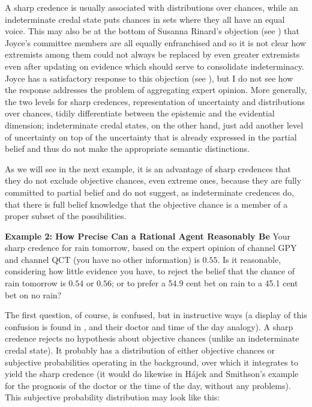 A sharp credence is usually associated with
distributions over chances, while an indeterminate
credal state puts chances in sets where they all have
an equal voice. This may also be at the bottom of
Susanna Rinard's objection (see
) that Joyce's committee members
are all equally enfranchised and so it is not clear how
extremists among them could not always be replaced by
even greater extremists even after updating on evidence
which should serve to consolidate indeterminacy. Joyce
has a satisfactory response to this objection (see
), but I do not see how the
response addresses the problem of aggregating expert
opinion. More generally, the two levels for sharp
credences, representation of uncertainty and
distributions over chances, tidily differentiate
between the epistemic and the evidential dimension;
indeterminate credal states, on the other hand, just
add another level of uncertainty on top of the
uncertainty that is already expressed in the partial
belief and thus do not make the appropriate semantic
distinctions.

As we will see in the next example, it is an advantage
of sharp credences that they do not exclude objective
chances, even extreme ones, because they are fully
committed to partial belief and do not suggest, as
indeterminate credences do, that there is full belief
knowledge that the objective chance is a member of a
proper subset of the possibilities.

\begin{quotex}
  \textbf{Example 2: How Precise Can a Rational Agent
    Reasonably Be} Your sharp credence for rain
  tomorrow, based on the expert opinion of channel GPY
  and channel QCT (you have no other information) is
  $0.55$. Is it reasonable, considering how little
  evidence you have, to reject the belief that the
  chance of rain tomorrow is $0.54$ or $0.56$; or to
  prefer a 54.9 cent bet on rain to a 45.1 cent bet on
  no rain?
\end{quotex}

The first question, of course, is confused, but in
instructive ways (a display of this confusion is found
in , and their doctor
and time of the day analogy). A sharp credence rejects
no hypothesis about objective chances (unlike an
indeterminate credal state). It probably has a
distribution of either objective chances or subjective
probabilities operating in the background, over which
it integrates to yield the sharp credence (it would do
likewise in H{\'a}jek and Smithson's example for the
prognosis of the doctor or the time of the day, without
any problems). This subjective probability distribution
may look like this:

